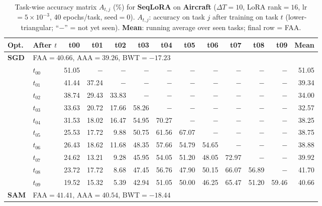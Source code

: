 
\begin{table}[ht]
\centering
\caption{%
  Task-wise accuracy matrix $A_{t,j}$ (\%) for \textbf{SeqLoRA} on \textbf{Aircraft} ($\Delta T=10$, LoRA rank$=16$, lr$=5\times10^{-3}$, 40 epochs/task, seed$=0$).
  $A_{t,j}$: accuracy on task $j$ after training on task $t$  (lower-triangular; ``$-$'' = not yet seen).
  \textbf{Mean}: running average over seen tasks; final row = FAA.
}
\label{tab:raw_seqlora_aircraft}
\setlength{\tabcolsep}{2.8pt}
\renewcommand{\arraystretch}{0.88}
\scriptsize
\begin{tabular}{@{}l l r r r r r r r r r r r@{}}
\toprule
\textbf{Opt.} & \textbf{After $t$} & \textbf{t00} & \textbf{t01} & \textbf{t02} & \textbf{t03} & \textbf{t04} & \textbf{t05} & \textbf{t06} & \textbf{t07} & \textbf{t08} & \textbf{t09} & \textbf{Mean} \\
\midrule
\multirow{11}{*}{\textbf{SGD}} & \multicolumn{12}{l}{\quad\small FAA$=40.66$,\; AAA$=39.26$,\; BWT$=-17.23$} \\
 & $t_{00}$ & 51.05 & $-$ & $-$ & $-$ & $-$ & $-$ & $-$ & $-$ & $-$ & $-$ & 51.05 \\
 & $t_{01}$ & 41.44 & 37.24 & $-$ & $-$ & $-$ & $-$ & $-$ & $-$ & $-$ & $-$ & 39.34 \\
 & $t_{02}$ & 38.74 & 29.43 & 33.83 & $-$ & $-$ & $-$ & $-$ & $-$ & $-$ & $-$ & 34.00 \\
 & $t_{03}$ & 33.63 & 20.72 & 17.66 & 58.26 & $-$ & $-$ & $-$ & $-$ & $-$ & $-$ & 32.57 \\
 & $t_{04}$ & 31.53 & 18.02 & 16.47 & 54.95 & 70.27 & $-$ & $-$ & $-$ & $-$ & $-$ & 38.25 \\
 & $t_{05}$ & 25.53 & 17.72 & 9.88 & 50.75 & 61.56 & 67.07 & $-$ & $-$ & $-$ & $-$ & 38.75 \\
 & $t_{06}$ & 26.43 & 18.62 & 11.68 & 48.35 & 57.66 & 54.79 & 54.65 & $-$ & $-$ & $-$ & 38.88 \\
 & $t_{07}$ & 24.62 & 13.21 & 9.28 & 45.95 & 54.05 & 51.20 & 48.05 & 72.97 & $-$ & $-$ & 39.92 \\
 & $t_{08}$ & 23.72 & 17.72 & 8.68 & 47.45 & 56.76 & 47.90 & 50.15 & 66.07 & 56.89 & $-$ & 41.70 \\
 & $t_{09}$ & 19.52 & 15.32 & 5.39 & 42.94 & 51.05 & 50.00 & 46.25 & 65.47 & 51.20 & 59.46 & 40.66 \\
\midrule
\multirow{11}{*}{\textbf{SAM}} & \multicolumn{12}{l}{\quad\small FAA$=41.41$,\; AAA$=40.54$,\; BWT$=-18.44$} \\

\end{tabular}
\end{table}
